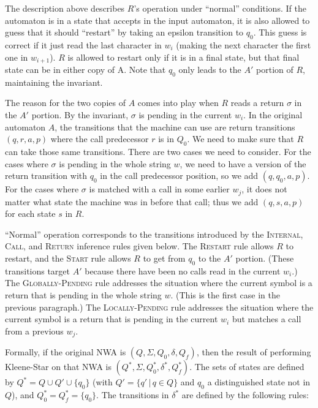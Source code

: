 The description above describes $R$'s operation under ``normal''
conditions. If the automaton is in a state that accepts in the input
automaton, it is also allowed to guess that it should ``restart'' by taking
an epsilon transition to $q_0$. This guess is correct if it just read the
last character in $w_i$ (making the next character the first one in
$w_{i+1}$). $R$ is allowed to restart only if it is in a final state, but
that final state can be in either copy of A. Note that $q_0$ only leads to
the $A'$ portion of $R$, maintaining the invariant.

The reason for the two copies of $A$ comes into play when $R$ reads a return
$\sigma$ in the $A'$ portion. By the invariant, $\sigma$ is pending in the
current $w_i$. In the original automaton $A$, the transitions that the
machine can use are return transitions $(q,r,a,p)$ where the call predecessor
$r$ is in $Q_0$. We need to make sure that $R$ can take those same
transitions. There are two cases we need to consider. For the cases where
$\sigma$ is pending in the whole string $w$, we need to have a version of the
return transition with $q_0$ in the call predecessor position, so we add $(q,
q_0, a, p)$. For the cases where $\sigma$ is matched with a call in some
earlier $w_j$, it does not matter what state the machine was in before that
call; thus we add $(q, s, a, p)$ for each state $s$ in $R$.

``Normal'' operation corresponds to the transitions introduced by the
\textsc{Internal}, \textsc{Call}, and \textsc{Return} inference rules given
below. The \textsc{Restart} rule allows $R$ to restart, and the
\textsc{Start} rule allows $R$ to get from $q_0$ to the $A'$ portion. (These
transitions target $A'$ because there have been no calls read in the current
$w_i$.) The \textsc{Globally-Pending} rule addresses the situation where the
current symbol is a return that is pending in the whole string $w$. (This is
the first case in the previous paragraph.) The \textsc{Locally-Pending} rule
addresses the situation where the current symbol is a return that is pending
in the current $w_i$ but matches a call from a previous $w_j$.


Formally, if the original NWA is $(Q, \Sigma, Q_0, \delta, Q_f)$,
then the result of performing Kleene-Star on that NWA is $(Q^*, \Sigma,
Q_0^*, \delta^*, Q_f^*)$. The sets of states are defined by $Q^* = Q \cup
Q' \cup \{q_0\}$ (with $Q' = \{q'\, |\, q \in Q\}$ and $q_0$ a
distinguished state not in $Q$),
and  $Q_0^* = Q_f^* = \{q_0\}$.
The transitions in $\delta^*$ are defined by the following rules:


